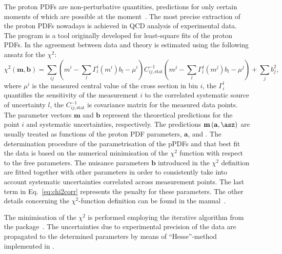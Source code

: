 The proton PDFs are non-perturbative quantities, predictions for only certain moments of which are possible at the moment~\cite{Hagler:2009ni}. The most precise extraction of the proton PDFs nowadays is achieved in QCD analysis of experimental data. The \herafitter program is a tool originally developed for least-square fits of the proton PDFs. In \herafitter the agreement between data and theory is estimated using the following ansatz for the $\chi^2$:
\begin{equation}
 \chi^2\left( \mathbf{m},\mathbf{b}\right) = \sum_{ij}{\left( m^i -\sum_{l}{\Gamma_l^i\left( m^i\right)b_l - \mu^i }\right) C^{-1}_{ij,\text{stat}} \left( m^j -\sum_{l}{\Gamma_l^j\left( m^j\right)b_l - \mu^j }\right) } + \sum_{j}{b_j^2},
 \label{eq:chi2corr}
\end{equation}
where $\mu^i$ is the measured central value of the cross section in bin $i$, the $\Gamma_i^l$ quantifies the sensitivity of the measurement $i$ to the correlated systematic source of uncertainty $l$, the $C^{-1}_{ij,\text{stat}}$ is covariance matrix for the measured data points. The parameter vectors $\mathbf{m}$ and $\mathbf{b}$ represent the theoretical predictions for the point $i$ and systematic uncertainties, respectively. The predictions $\mathbf{m}\left( \mathbf{a},\asz\right)$ are usually treated as functions of the proton PDF parameters, $\mathbf{a}$,  and \asz. The determination procedure of the parametrisation of the pPDFs and \as that best fit the data is based on the numerical minimisation of the $\chi^2$ function with respect to the free parameters. The nuisance parameters $\mathbf{b}$ introduced in the $\chi^2$ definition are fitted together with other parameters in order to consistently take into account systematic uncertainties correlated across measurement points. The last term in Eq.~\eqref{eq:chi2corr} represents the penalty for these parameters. The other details concerning the $\chi^2$-function definition can be found in the \herafitter manual~\cite{herafitter:2014:manual}.

The minimisation of the $\chi^2$ is performed employing the iterative \migrad algorithm from the \minuit package~\cite{James:1975dr}. The uncertainties due to experimental precision of the data are propagated to the determined parameters by means of ``Hesse''-method implemented in \minuit.

